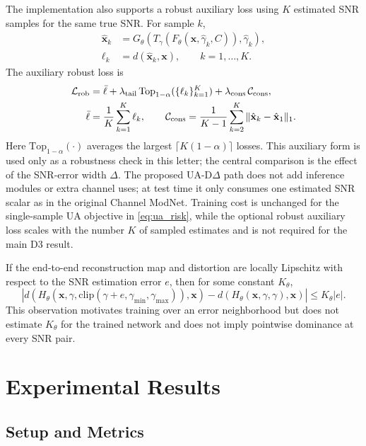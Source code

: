 \documentclass[10pt,journal]{IEEEtran}
\begin{document}
The implementation also supports a robust auxiliary loss using $K$ estimated SNR samples for the same true SNR. For sample $k$,
\begin{align}
\hat{\mathbf{x}}_k
&=G_{\theta}(T_{\gamma}(F_{\theta}(\mathbf{x},\hat{\gamma}_k,C)),\hat{\gamma}_k), \label{eq:xhat_k}\\
\ell_k&=d(\hat{\mathbf{x}}_k,\mathbf{x}),\qquad k=1,\ldots,K . \label{eq:sample_loss}
\end{align}
The auxiliary robust loss is
\begin{align}
\mathcal{L}_{\rm rob}
&=\bar{\ell}
+\lambda_{\rm tail}\,\mathrm{Top}_{1-\alpha}(\{\ell_k\}_{k=1}^{K})
+\lambda_{\rm cons}\,\mathcal{C}_{\rm cons}, \label{eq:robust_loss}\\
\bar{\ell}
&=\frac{1}{K}\sum_{k=1}^{K}\ell_k,\qquad
\mathcal{C}_{\rm cons}=\frac{1}{K-1}\sum_{k=2}^{K}\|\hat{\mathbf{x}}_k-\hat{\mathbf{x}}_1\|_1 .
\label{eq:consistency}
\end{align}
Here $\mathrm{Top}_{1-\alpha}(\cdot)$ averages the largest $\lceil K(1-\alpha)\rceil$ losses. This auxiliary form is used only as a robustness check in this letter; the central comparison is the effect of the SNR-error width $\Delta$.
The proposed UA-D$\Delta$ path does not add inference modules or extra channel uses; at test time it only consumes one estimated SNR scalar as in the original Channel ModNet. Training cost is unchanged for the single-sample UA objective in \eqref{eq:ua_risk}, while the optional robust auxiliary loss scales with the number $K$ of sampled estimates and is not required for the main D3 result.

If the end-to-end reconstruction map and distortion are locally Lipschitz with respect to the SNR estimation error $e$, then for some constant $K_{\theta}$,
\begin{equation}
\left|d(H_{\theta}(\mathbf{x},\gamma,\mathrm{clip}(\gamma+e,\gamma_{\min},\gamma_{\max})),\mathbf{x})
-d(H_{\theta}(\mathbf{x},\gamma,\gamma),\mathbf{x})\right|
\le K_{\theta}|e|.
\label{eq:lipschitz}
\end{equation}
This observation motivates training over an error neighborhood but does not estimate $K_{\theta}$ for the trained network and does not imply pointwise dominance at every SNR pair.

\section{Experimental Results}

\subsection{Setup and Metrics}
\end{document}
